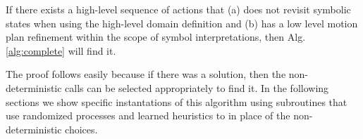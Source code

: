 \begin{thm}
If there exists a high-level sequence of actions that 
(a) does not revisit symbolic states when using the high-level domain
definition and (b) has a low level motion plan refinement within the scope
of symbol interpretations, then Alg.\,\ref{alg:complete} will find it. 
\end{thm}

The proof follows easily because if there was a solution, then
the non-deterministic calls can be selected appropriately to find
it. In the following sections we show specific instantations of this
algorithm using subroutines that use randomized processes and learned
heuristics to in place of the non-deterministic choices.



